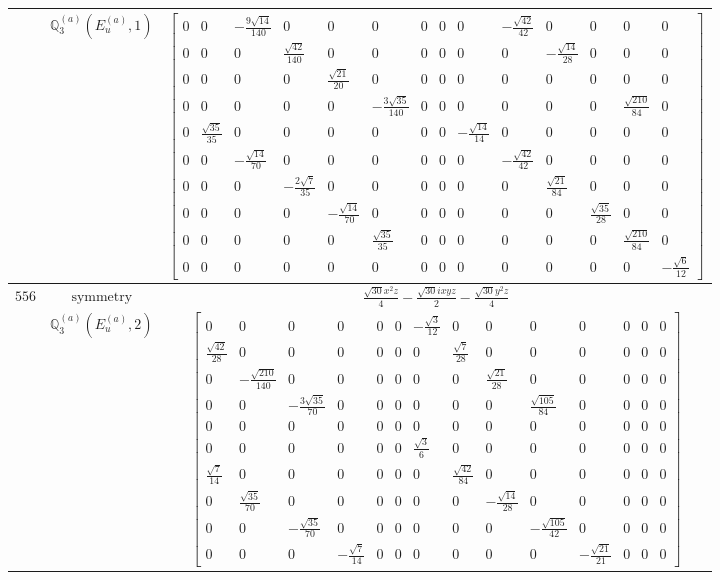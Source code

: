 \documentclass[fleqn,8pt,landscape]{jsarticle}
\begin{document}
\begin{longtable}{ccc}
$  $ & $ \mathbb{Q}_{3}^{(a)}(E_{u}^{(a)},1) $ & $ \begin{bmatrix} 0 & 0 & - \frac{9 \sqrt{14}}{140} & 0 & 0 & 0 & 0 & 0 & 0 & - \frac{\sqrt{42}}{42} & 0 & 0 & 0 & 0 \\ 0 & 0 & 0 & \frac{\sqrt{42}}{140} & 0 & 0 & 0 & 0 & 0 & 0 & - \frac{\sqrt{14}}{28} & 0 & 0 & 0 \\ 0 & 0 & 0 & 0 & \frac{\sqrt{21}}{20} & 0 & 0 & 0 & 0 & 0 & 0 & 0 & 0 & 0 \\ 0 & 0 & 0 & 0 & 0 & - \frac{3 \sqrt{35}}{140} & 0 & 0 & 0 & 0 & 0 & 0 & \frac{\sqrt{210}}{84} & 0 \\ 0 & \frac{\sqrt{35}}{35} & 0 & 0 & 0 & 0 & 0 & 0 & - \frac{\sqrt{14}}{14} & 0 & 0 & 0 & 0 & 0 \\ 0 & 0 & - \frac{\sqrt{14}}{70} & 0 & 0 & 0 & 0 & 0 & 0 & - \frac{\sqrt{42}}{42} & 0 & 0 & 0 & 0 \\ 0 & 0 & 0 & - \frac{2 \sqrt{7}}{35} & 0 & 0 & 0 & 0 & 0 & 0 & \frac{\sqrt{21}}{84} & 0 & 0 & 0 \\ 0 & 0 & 0 & 0 & - \frac{\sqrt{14}}{70} & 0 & 0 & 0 & 0 & 0 & 0 & \frac{\sqrt{35}}{28} & 0 & 0 \\ 0 & 0 & 0 & 0 & 0 & \frac{\sqrt{35}}{35} & 0 & 0 & 0 & 0 & 0 & 0 & \frac{\sqrt{210}}{84} & 0 \\ 0 & 0 & 0 & 0 & 0 & 0 & 0 & 0 & 0 & 0 & 0 & 0 & 0 & - \frac{\sqrt{6}}{12} \end{bmatrix} $ \\ \hline
$ 556 $ & $ \text{symmetry} $ & $ \frac{\sqrt{30} x^{2} z}{4} - \frac{\sqrt{30} i x y z}{2} - \frac{\sqrt{30} y^{2} z}{4} $ \\
$  $ & $ \mathbb{Q}_{3}^{(a)}(E_{u}^{(a)},2) $ & $ \begin{bmatrix} 0 & 0 & 0 & 0 & 0 & 0 & - \frac{\sqrt{3}}{12} & 0 & 0 & 0 & 0 & 0 & 0 & 0 \\ \frac{\sqrt{42}}{28} & 0 & 0 & 0 & 0 & 0 & 0 & \frac{\sqrt{7}}{28} & 0 & 0 & 0 & 0 & 0 & 0 \\ 0 & - \frac{\sqrt{210}}{140} & 0 & 0 & 0 & 0 & 0 & 0 & \frac{\sqrt{21}}{28} & 0 & 0 & 0 & 0 & 0 \\ 0 & 0 & - \frac{3 \sqrt{35}}{70} & 0 & 0 & 0 & 0 & 0 & 0 & \frac{\sqrt{105}}{84} & 0 & 0 & 0 & 0 \\ 0 & 0 & 0 & 0 & 0 & 0 & 0 & 0 & 0 & 0 & 0 & 0 & 0 & 0 \\ 0 & 0 & 0 & 0 & 0 & 0 & \frac{\sqrt{3}}{6} & 0 & 0 & 0 & 0 & 0 & 0 & 0 \\ \frac{\sqrt{7}}{14} & 0 & 0 & 0 & 0 & 0 & 0 & \frac{\sqrt{42}}{84} & 0 & 0 & 0 & 0 & 0 & 0 \\ 0 & \frac{\sqrt{35}}{70} & 0 & 0 & 0 & 0 & 0 & 0 & - \frac{\sqrt{14}}{28} & 0 & 0 & 0 & 0 & 0 \\ 0 & 0 & - \frac{\sqrt{35}}{70} & 0 & 0 & 0 & 0 & 0 & 0 & - \frac{\sqrt{105}}{42} & 0 & 0 & 0 & 0 \\ 0 & 0 & 0 & - \frac{\sqrt{7}}{14} & 0 & 0 & 0 & 0 & 0 & 0 & - \frac{\sqrt{21}}{21} & 0 & 0 & 0 \end{bmatrix} $ \\ \hline

\end{longtable}
\end{document}
